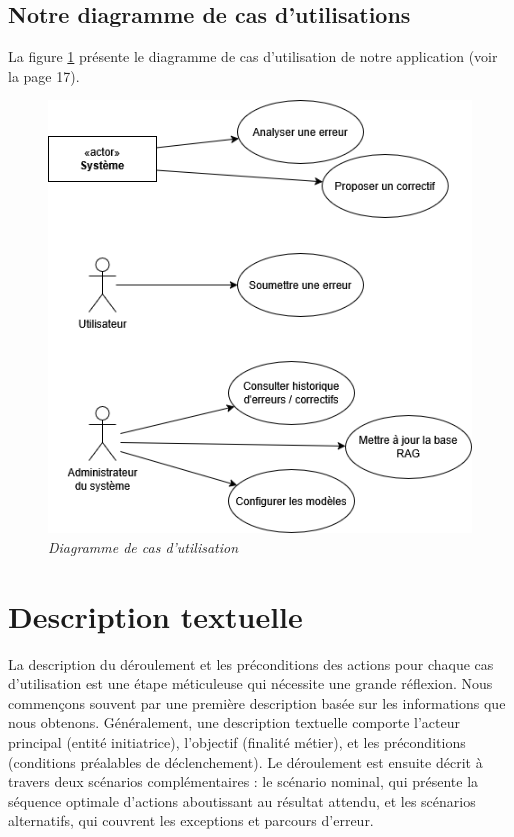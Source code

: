 \documentclass[12pt,a4paper]{report}
\begin{document}
	\subsection{Notre diagramme de cas d'utilisations}
	
	La figure \ref{fig:use-case} présente le diagramme de cas d'utilisation de notre application (voir la page 17).
	
	\begin{figure}[H]
		\centering
		\includegraphics{use-case.drawio.png}
		\caption{\textit{Diagramme de cas d'utilisation}}
		\label{fig:use-case}
	\end{figure}
	
	\section{Description textuelle}
	
	La description du déroulement et les préconditions des actions pour chaque cas d'utilisation est une étape méticuleuse qui nécessite une grande réflexion. Nous commençons souvent par une première description basée sur les informations que nous obtenons.
	Généralement, une description textuelle comporte l'acteur principal (entité initiatrice), l'objectif (finalité métier), et les préconditions (conditions préalables de déclenchement). Le déroulement est ensuite décrit à travers deux scénarios complémentaires : le scénario nominal, qui présente la séquence optimale d'actions aboutissant au résultat attendu, et les scénarios alternatifs, qui couvrent les exceptions et parcours d'erreur.
	
\end{document}
